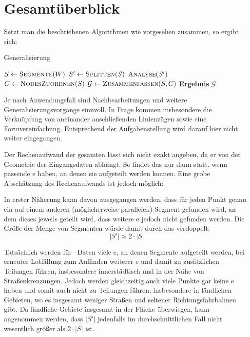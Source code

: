 \documentclass[../main/thesis.tex]{subfiles}
\begin{document}
\section{Gesamtüberblick}
\label{ch:algorithm-overview}

Setzt man die beschriebenen Algorithmen wie vorgesehen zusammen, so ergibt sich:

\begin{algorithmhere}{Generalisierung}
\label{alg:Generalisierung}
\begin{algorithmic}
	\State $S \gets \textproc{Segmente}(W)$
	\State $S' \gets \textproc{Splitten}(S)$
	\State $\textproc{Analyse}(S')$
	\State $C \gets \textproc{NodesZuordnen}(S)$
	\State $\mathcal{G} \gets \textproc{Zusammenfassen}(S, C)$
	\State \textbf{Ergebnis} $\mathcal{G}$
\EndFunction
\end{algorithmic}
\end{algorithmhere}


Je nach Anwendungsfall sind Nachbearbeitungen und weitere Generalisierungsvorgänge sinnvoll.
In Frage kommen insbesondere die Verknüpfung von aneinander anschließenden Linienzügen sowie eine Formvereinfachung.
Entsprechend der Aufgabenstellung wird darauf hier nicht weiter eingegangen.

Der Rechenaufwand der gesamten  lässt sich nicht exakt angeben, da er von der Geometrie der Eingangsdaten abhängt.
So findet das  nur dann statt, wenn  passende e haben, an denen sie aufgeteilt werden können.
Eine grobe Abschätzung des Rechenaufwands ist jedoch möglich:

In erster Näherung kann davon ausgegangen werden, dass für jeden Punkt genau ein  auf einem anderen (möglicherweise parallelen) Segment gefunden wird, an dem dieses jeweils geteilt wird, dass weitere e jedoch nicht gefunden werden.
Die Größe der Menge von Segmenten würde damit durch das  verdoppelt:
\[
|S'| \approx 2 \cdot |S|
\]

Tatsächlich werden für --Daten viele e, an denen Segmente aufgeteilt werden, bei erneuter Lotfällung zum Auffinden weiterer e und damit zu zusätzlichen Teilungen führen, insbesondere innerstädtisch und in der Nähe von Straßenkreuzungen.
Jedoch werden gleichzeitig auch viele Punkte gar keine e haben und somit auch nicht zu Teilungen führen, insbesondere in ländlichen Gebieten, wo es insgesamt weniger Straßen und seltener Richtungsfahrbahnen gibt.
Da ländliche Gebiete insgesamt in der Fläche überwiegen, kann angenommen werden, dass $|S'|$ jedenfalls im durchschnittlichen Fall nicht wesentlich größer als $2 \cdot |S|$ ist.
\end{document}
